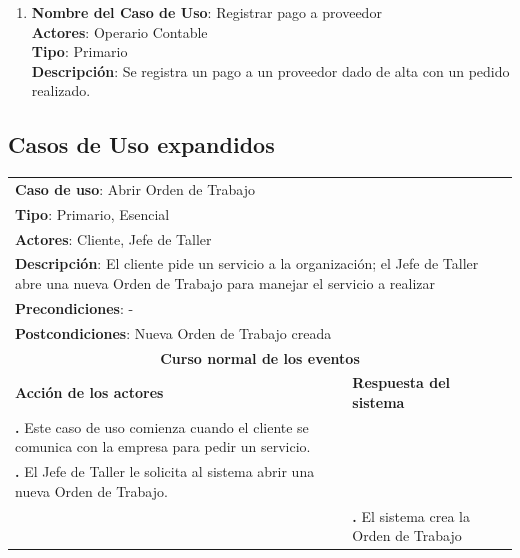 \documentclass[12pt]{extarticle}
\begin{document}
\begin{spacing}{1.2}
\begin{enumerate}
            \item 	\textbf{Nombre del Caso de Uso}: Registrar pago a proveedor\\
                    \textbf{Actores}: Operario Contable\\
                    \textbf{Tipo}: Primario\\
                    \textbf{Descripción}: Se registra un pago a un proveedor dado de alta con un pedido realizado.
        \end{enumerate}
        \clearpage
        \subsection{Casos de Uso expandidos}



        \newcommand\inc{\stepcounter{step}\textbf{\thestep. }}



        \begin{longtable}{ |p{8cm}|p{8cm}| }
            \hline
            \multicolumn{2}{|p{16cm}|}{\textbf{Caso de uso}: Abrir Orden de Trabajo}\\
            \multicolumn{2}{|p{16cm}|}{\textbf{Tipo}: Primario, Esencial}\\
            \multicolumn{2}{|p{16cm}|}{\textbf{Actores}: Cliente, Jefe de Taller}\\
            \multicolumn{2}{|p{16cm}|}{\textbf{Descripción}: El cliente pide un servicio a la organización; el Jefe de Taller abre una nueva Orden de Trabajo para manejar el servicio a realizar}\\
            \multicolumn{2}{|p{16cm}|}{\textbf{Precondiciones}: -}\\
            \multicolumn{2}{|p{16cm}|}{\textbf{Postcondiciones}: Nueva Orden de Trabajo creada}\\
            \hline
            \multicolumn{2}{|c|}{\textbf{Curso normal de los eventos}}\\
            \hline
            \textbf{Acción de los actores} & \textbf{Respuesta del sistema}\\
            \hline
                \inc Este caso de uso comienza cuando el cliente se comunica con la empresa para pedir un servicio. & \\
                \hline

                \inc El Jefe de Taller le solicita al sistema abrir una nueva Orden de Trabajo. &  \\
                \hline
                & \inc El sistema crea la Orden de Trabajo  \\


\end{longtable}
\end{spacing}
\end{document}
